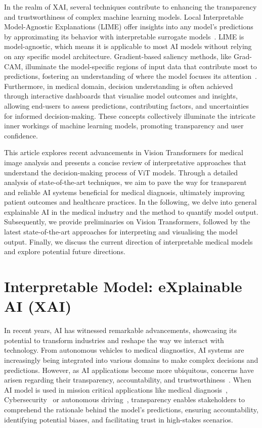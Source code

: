 \documentclass[dvipsnames]{article}
\renewcommand{\cite}[1]{\autocite{#1}}
\begin{document}
In the realm of XAI, several techniques contribute to enhancing the transparency and trustworthiness of complex machine learning models.
Local Interpretable Model-Agnostic Explanations (LIME) offer insights into any model's predictions by approximating its behavior with interpretable surrogate models~\cite{ribeiro2016should}.
LIME is model-agnostic, which means it is applicable to most AI models without relying on any specific model architecture.
Gradient-based saliency methods, like Grad-CAM, illuminate the model-specific regions of input data that contribute most to predictions, fostering an understanding of where the model focuses its attention~\cite{selvaraju2017grad}.
Furthermore, in medical domain, decision understanding is often achieved through interactive dashboards that visualise model outcomes and insights, allowing end-users to assess predictions, contributing factors, and uncertainties for informed decision-making.
These concepts collectively illuminate the intricate inner workings of machine learning models, promoting transparency and user confidence.

This article explores recent advancements in Vision Transformers for medical image analysis and presents a concise review of interpretative approaches that understand the decision-making process of ViT models. Through a detailed analysis of state-of-the-art techniques, we aim to pave the way for transparent and reliable AI systems beneficial for medical diagnosis, ultimately improving patient outcomes and healthcare practices.
In the following, we delve into general explainable AI in the medical industry and the method to quantify model output. Subsequently, we provide preliminaries on Vision Transformers, followed by the latest state-of-the-art approaches for interpreting and visualising the model output. Finally, we discuss the current direction of interpretable medical models and explore potential future directions.



\section{Interpretable Model: e\textbf{X}plainable \textbf{AI} (XAI)}


In recent years, AI has witnessed remarkable advancements, showcasing its potential to transform industries and reshape the way we interact with technology. From autonomous vehicles to medical diagnostics, AI systems are increasingly being integrated into various domains to make complex decisions and predictions.
However, as AI applications become more ubiquitous, concerns have arisen regarding their transparency, accountability, and trustworthiness~\cite{shin2020user}.
When AI model is used in mission critical applications like medical diagnosis~\cite{balasubramaniam2022transparency}, Cybersecurity~\cite{lai2023ensemble} or autonomous driving~\cite{imai2019legal}, transparency enables stakeholders to comprehend the rationale behind the model's predictions, ensuring accountability, identifying potential biases, and facilitating trust in high-stakes scenarios.
\end{document}
